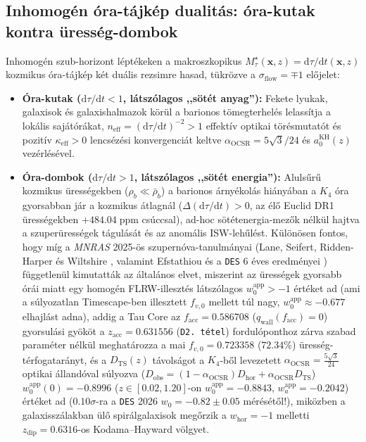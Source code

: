 \documentclass[11pt,a4paper]{article}
\theoremstyle{remark}
\begin{document}
\subsection{Inhomog\'en \'ora-t\'ajk\'ep dualit\'as: \'ora-kutak kontra \"uress\'eg-dombok}

Inhomog\'en szub-horizont l\'ept\'ekeken \cite{JolcsakTauPaper20Euclid2026} a makroszkopikus $M_\tau^\star(\mathbf{x}, z) = \mathrm{d}\tau/\mathrm{d}t(\mathbf{x}, z)$ kozmikus \'ora-t\'ajk\'ep k\'et du\'alis rezsimre hasad, t\"ukr\"ozve a $\sigma_{\mathrm{flow}} = \mp 1$ el\H{o}jelet:
\begin{itemize}
  \item \textbf{\'Ora-kutak ($\mathrm{d}\tau/\mathrm{d}t < 1$, l\'atsz\'olagos ,,s\"ot\'et anyag''):} Fekete lyukak, galaxisok \'es galaxishalmazok k\"or\"ul a barionos t\"omegterhel\'es lelass\'itja a lok\'alis saj\'at\'or\'akat, $n_{\mathrm{eff}} = (\mathrm{d}\tau/\mathrm{d}t)^{-2} > 1$ effekt\'iv optikai t\"or\'esmutat\'ot \'es pozit\'iv $\kappa_{\mathrm{eff}} > 0$ lencs\'ez\'esi konvergenci\'at keltve $\alpha_{\mathrm{OCSR}} = 5\sqrt{3}/24$ \'es $a_0^{\mathrm{KH}}(z)$ vez\'erl\'es\'evel.
  \item \textbf{\'Ora-dombok ($\mathrm{d}\tau/\mathrm{d}t > 1$, l\'atsz\'olagos ,,s\"ot\'et energia''):} Aluls\H{u}r\H{u} kozmikus \"uress\'egekben ($\rho_b \ll \bar{\rho}_b$) a barionos \'arny\'ekol\'as hi\'any\'aban a $K_4$ \'ora gyorsabban j\'ar a kozmikus \'atlagn\'al ($\Delta(\mathrm{d}\tau/\mathrm{d}t) > 0$, az \'el\H{o} Euclid DR1 \"uress\'egekben $+484.04\;\mathrm{ppm}$ cs\'uccsal), ad-hoc s\"ot\'etenergia-mez\H{o}k n\'elk\"ul hajtva a szuper\"uress\'egek t\'agul\'as\'at \'es az anom\'alis ISW-leh\H{u}l\'est. K\"ul\"on\"osen fontos, hogy m\'ig a \textit{MNRAS} 2025-\"os szupern\'ova-tanulm\'anyai (Lane, Seifert, Ridden-Harper \'es Wiltshire \cite{LaneWiltshire2025MNRAS,SeifertWiltshire2025MNRAS}, valamint Efstathiou \cite{Efstathiou2025SN} \'es a \texttt{DES} 6 \'eves eredm\'enyei \cite{DES2026DynDE}) f\"uggetlen\"ul kimutatt\'ak az \'altal\'anos elvet, miszerint az \"uress\'egek gyorsabb \'or\'ai miatt egy homog\'en FLRW-illeszt\'es l\'atsz\'olagos $w_0^{\mathrm{app}} > -1$ \'ert\'eket ad (ami a s\'ulyozatlan Timescape-ben illesztett $f_{v,0}$ mellett t\'ul nagy, $w_0^{\mathrm{app}} \approx -0.677$ elhajl\'ast adna), addig a Tau Core az $f_{\mathrm{acc}} = 0.586708$ ($q_{\mathrm{wall}}(f_{\mathrm{acc}}) = 0$) gyorsul\'asi gy\"ok\"ot a $z_{\mathrm{acc}} = 0.631556$ (\texttt{D2.\ t\'etel}) fordul\'oponthoz z\'arva szabad param\'eter n\'elk\"ul meghat\'arozza a mai $f_{v,0} = \mathbf{0.723358}$ ($72.34\%$) \"uress\'eg-t\'erfogatar\'anyt, \'es a $D_{\mathrm{TS}}(z)$ t\'avols\'agot a $K_4$-b\H{o}l levezetett $\alpha_{\mathrm{OCSR}} = \frac{5\sqrt{3}}{24}$ optikai \'alland\'oval s\'ulyozva ($D_{\mathrm{obs}} = (1-\alpha_{\mathrm{OCSR}})D_{\mathrm{hor}} + \alpha_{\mathrm{OCSR}}D_{\mathrm{TS}}$) $w_0^{\mathrm{app}}(0) = \mathbf{-0.8996}$ ($z \in [0.02,1.20]$-on $w_0^{\mathrm{app}} = \mathbf{-0.8843}$, $w_a^{\mathrm{app}} = -0.2042$) \'ert\'eket ad ($0.10\sigma$-ra a \texttt{DES} 2026 $w_0 = -0.82 \pm 0.05$ m\'er\'es\'et\H{o}l!), mik\"ozben a galaxissz\'alakban \"ul\H{o} spir\'algalaxisok meg\H{o}rzik a $w_{\mathrm{hor}} = -1$ melletti $z_{\mathrm{dip}} = 0.6316$-os Kodama--Hayward v\"olgyet.

\end{itemize}
\end{document}
